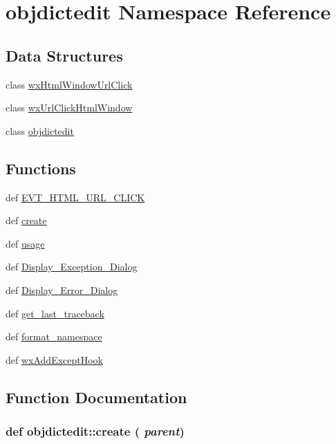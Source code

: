 \hypertarget{namespaceobjdictedit}{
\section{objdictedit Namespace Reference}
\label{namespaceobjdictedit}
}


\subsection*{Data Structures}
\begin{CompactItemize}
\item 
class \hyperlink{classobjdictedit_1_1wxHtmlWindowUrlClick}{wx\-Html\-Window\-Url\-Click}
\item 
class \hyperlink{classobjdictedit_1_1wxUrlClickHtmlWindow}{wx\-Url\-Click\-Html\-Window}
\item 
class \hyperlink{classobjdictedit_1_1objdictedit}{objdictedit}
\end{CompactItemize}
\subsection*{Functions}
\begin{CompactItemize}
\item 
def \hyperlink{namespaceobjdictedit_6f56af22e4041461f4f3852041fd46cf}{EVT\_\-HTML\_\-URL\_\-CLICK}
\item 
def \hyperlink{namespaceobjdictedit_6676940963fc8d2458cc3df0739cc43f}{create}
\item 
def \hyperlink{namespaceobjdictedit_32e0bb76ebce2730cbb78c694b11e015}{usage}
\item 
def \hyperlink{namespaceobjdictedit_2c93a930b5594c97af560c8b245651ad}{Display\_\-Exception\_\-Dialog}
\item 
def \hyperlink{namespaceobjdictedit_e994527ec0f61cfe371dfa80d802d4cb}{Display\_\-Error\_\-Dialog}
\item 
def \hyperlink{namespaceobjdictedit_54964903be300a8ce9ee85eb67d5956e}{get\_\-last\_\-traceback}
\item 
def \hyperlink{namespaceobjdictedit_929d463a75220fa2964868f9495a944e}{format\_\-namespace}
\item 
def \hyperlink{namespaceobjdictedit_7a105b1694af4346e8de2a012657d49f}{wx\-Add\-Except\-Hook}
\end{CompactItemize}


\subsection{Function Documentation}
\hypertarget{namespaceobjdictedit_6676940963fc8d2458cc3df0739cc43f}{
\subsubsection[create]{\setlength{\rightskip}{0pt plus 5cm}def objdictedit::create ( {\em parent})}}
\label{namespaceobjdictedit_6676940963fc8d2458cc3df0739cc43f}




